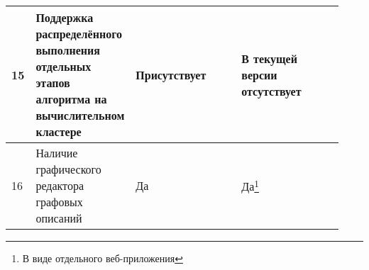 \begin{landscape}
\begin{longtable}{|p{0.03\linewidth}|p{0.2\linewidth}|p{0.35\linewidth}|p{0.35\linewidth}|}
        15         & Поддержка распределённого выполнения отдельных этапов алгоритма на вычислительном кластере & Присутствует                                                                                                                                                                                                                                                                                                                                                                                                                                                                                                                                                                                                                                                       & В текущей версии отсутствует                                                                                                                                                                                                                                                                     \\
        \hline
        16         & Наличие графического редактора графовых описаний                                           & Да                                                                                                                                                                                                                                                                                                                                                                                                                                                                                                                                                                                                                                                                 & Да\footnote{В виде отдельного веб-приложения}                                                                                                                                                                                                                                                    \\
        \hline

\end{longtable}
\end{landscape}
